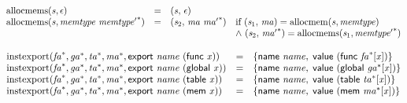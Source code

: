 $$
\begin{array}{@{}lcl@{}l@{}}
{\mathrm{allocmems}}({\mathit{s}}, \epsilon) &=& ({\mathit{s}},\, \epsilon) &  \\
{\mathrm{allocmems}}({\mathit{s}}, {\mathit{memtype}}~{{\mathit{memtype}'}^\ast}) &=& ({\mathit{s}}_{{2}},\, {\mathit{ma}}~{{\mathit{ma}'}^\ast}) &\quad
  \mbox{if}~({\mathit{s}}_{{1}},\, {\mathit{ma}}) = {\mathrm{allocmem}}({\mathit{s}}, {\mathit{memtype}}) \\
 &&&\quad {\land}~({\mathit{s}}_{{2}},\, {{\mathit{ma}'}^\ast}) = {\mathrm{allocmems}}({\mathit{s}}_{{1}}, {{\mathit{memtype}'}^\ast}) \\
\end{array}
$$

\vspace{1ex}

$$
\begin{array}{@{}lcl@{}l@{}}
{\mathrm{instexport}}({{\mathit{fa}}^\ast}, {{\mathit{ga}}^\ast}, {{\mathit{ta}}^\ast}, {{\mathit{ma}}^\ast}, \mathsf{export}~{\mathit{name}}~(\mathsf{func}~{\mathit{x}})) &=& \{ \begin{array}[t]{@{}l@{}}
\mathsf{name}~{\mathit{name}},\; \mathsf{value}~(\mathsf{func}~{{\mathit{fa}}^\ast}{}[{\mathit{x}}]) \}\end{array} &  \\
{\mathrm{instexport}}({{\mathit{fa}}^\ast}, {{\mathit{ga}}^\ast}, {{\mathit{ta}}^\ast}, {{\mathit{ma}}^\ast}, \mathsf{export}~{\mathit{name}}~(\mathsf{global}~{\mathit{x}})) &=& \{ \begin{array}[t]{@{}l@{}}
\mathsf{name}~{\mathit{name}},\; \mathsf{value}~(\mathsf{global}~{{\mathit{ga}}^\ast}{}[{\mathit{x}}]) \}\end{array} &  \\
{\mathrm{instexport}}({{\mathit{fa}}^\ast}, {{\mathit{ga}}^\ast}, {{\mathit{ta}}^\ast}, {{\mathit{ma}}^\ast}, \mathsf{export}~{\mathit{name}}~(\mathsf{table}~{\mathit{x}})) &=& \{ \begin{array}[t]{@{}l@{}}
\mathsf{name}~{\mathit{name}},\; \mathsf{value}~(\mathsf{table}~{{\mathit{ta}}^\ast}{}[{\mathit{x}}]) \}\end{array} &  \\
{\mathrm{instexport}}({{\mathit{fa}}^\ast}, {{\mathit{ga}}^\ast}, {{\mathit{ta}}^\ast}, {{\mathit{ma}}^\ast}, \mathsf{export}~{\mathit{name}}~(\mathsf{mem}~{\mathit{x}})) &=& \{ \begin{array}[t]{@{}l@{}}
\mathsf{name}~{\mathit{name}},\; \mathsf{value}~(\mathsf{mem}~{{\mathit{ma}}^\ast}{}[{\mathit{x}}]) \}\end{array} &  \\
\end{array}
$$

